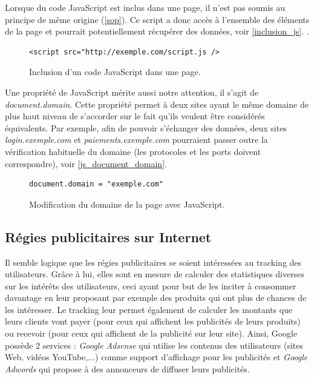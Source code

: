 Lorsque du code JavaScript est inclus dans une page, il n'est pas soumis au principe de même origine (\autoref{sop}). Ce script a donc accès à l'ensemble des éléments de la page et pourrait potentiellement récupérer des données, voir \autoref{inclusion_js}. \cite{sullivan2011web}.
\begin{figure}[h]
	\centering
	\begin{lstlisting}
<script src="http://exemple.com/script.js />
	\end{lstlisting}
	\caption{\label{inclusion_js}Inclusion d'un code JavaScript dans une page.}
\end{figure}

Une propriété de JavaScript mérite aussi notre attention, il s'agit de \textit{document.domain}. Cette propriété permet à deux sites ayant le même domaine de plus haut niveau de s'accorder sur le fait qu'ils veulent être considérés équivalents. Par exemple, afin de pouvoir s'échanger des données, deux sites \textit{login.exemple.com} et \textit{paiements.exemple.com} pourraient passer outre la vérification habituelle du domaine (les protocoles et les ports doivent correspondre), voir \autoref{js_document_domain}.
\begin{figure}[h]
	\centering
	\begin{lstlisting}
document.domain = "exemple.com"
	\end{lstlisting}
	\caption{\label{js_document_domain}Modification du domaine de la page avec JavaScript.}
\end{figure}

\subsection{Régies publicitaires sur Internet}
Il semble logique que les régies publicitaires se soient intéressées au tracking des utilisateurs. Grâce à lui, elles sont en mesure de calculer des statistiques diverses sur les intérêts des utilisateurs, ceci ayant pour but de les inciter à consommer davantage en leur proposant par exemple des produits qui ont plus de chances de les intéresser. Le tracking leur permet également de calculer les montants que leurs clients vont payer (pour ceux qui affichent les publicités de leurs produits) ou recevoir (pour ceux qui affichent de la publicité sur leur site). Ainsi, Google possède 2 services : \textit{Google Adsense} qui utilise les contenus des utilisateurs (sites Web, vidéos YouTube,...) comme support d'affichage pour les publicités et \textit{Google Adwords} qui propose à des annonceurs de diffuser leurs publicités.
\newline

